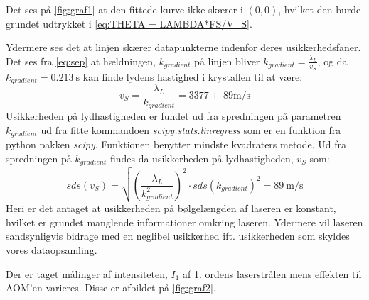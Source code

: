\documentclass[main]{subfiles}
\begin{document}
Det ses på \cref{fig:graf1} at den fittede kurve ikke skærer i $(0,0)$, hvilket den burde grundet udtrykket i \cref{eq:THETA = LAMBDA*FS/V_S}.%

Ydermere ses det at linjen skærer datapunkterne indenfor deres usikkerhedsfaner. Det ses fra \cref{eq:sep} at hældningen, $k_{gradient}$ på linjen bliver $ k_{gradient} = \frac{\lambda_L}{v_S}$, og da $k_{gradient} = \SI{0,213}{\second}$ kan finde lydens hastighed i krystallen til at være:
\begin{equation}
  \nonumber v_S = \frac{\lambda_L}{k_{gradient}} = 3377 \pm \ 89 \si{\meter\per\second}
\end{equation}
Usikkerheden på lydhastigheden er fundet ud fra spredningen på parametren $k_{gradient}$ ud fra fitte kommandoen \textsl{scipy.stats.linregress} som er en funktion fra python pakken \textsl{scipy}. Funktionen benytter mindste kvadraters metode. Ud fra spredningen på $k_{gradient}$ findes da usikkerheden på lydhastigheden, $v_S$ som:
\begin{equation}
  \nonumber sds(v_S) = \sqrt{\left(\frac{\lambda_L}{k_{gradient}^2}\right)^2 \cdot sds(k_{gradient})^2} = \SI{89}{\meter\per\second}
\end{equation}
Heri er det antaget at usikkerheden på bølgelængden af laseren er konstant, hvilket er grundet manglende informationer omkring laseren. Ydermere vil laseren sandsynligvis bidrage med en neglibel usikkerhed ift. usikkerheden som skyldes vores dataopsamling.

\bigskip

Der er taget målinger af intensiteten, $I_1$ af 1. ordens laserstrålen mens effekten til AOM'en varieres. Disse er afbildet på \cref{fig:graf2}.
\end{document}
